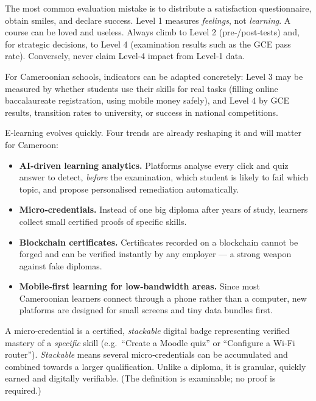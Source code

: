 \documentclass[11pt]{article}
\newcommand{\cle}[1]{{\popxbold\color{popdark}#1}}
\newcounter{popsec}
\newcounter{popsub}
\newcommand{\courssub}[1]{%
  \stepcounter{popsub}%
  \par\vspace{9pt}\noindent{\popxbold\fontsize{11.5}{13}\selectfont\color{popink}{\color{poporange}\thepopsec.\thepopsub}\hspace{6pt}#1}\par\nopagebreak\vspace{4pt}
}
\begin{document}
\begin{attention}
The most common evaluation mistake is to distribute a satisfaction questionnaire, obtain smiles, and declare success. Level 1 measures \emph{feelings}, not \emph{learning}. A course can be loved and useless. Always climb to Level 2 (pre‑/post‑tests) and, for strategic decisions, to Level 4 (examination results such as the GCE pass rate). Conversely, never claim Level‑4 impact from Level‑1 data.
\end{attention}

For Cameroonian schools, indicators can be adapted concretely: Level 3 may be measured by whether students use their skills for real tasks (filling online baccalaureate registration, using mobile money safely), and Level 4 by GCE results, transition rates to university, or success in national competitions.

\courssub{Future Trends in E‑Learning}

E‑learning evolves quickly. Four trends are already reshaping it and will matter for Cameroon:

\begin{itemize}
\item \textbf{AI‑driven learning analytics.} Platforms analyse every click and quiz answer to detect, \emph{before} the examination, which student is likely to fail which topic, and propose personalised remediation automatically.
\item \textbf{Micro‑credentials.} Instead of one big diploma after years of study, learners collect small certified proofs of specific skills.
\item \textbf{Blockchain certificates.} Certificates recorded on a blockchain cannot be forged and can be verified instantly by any employer — a strong weapon against fake diplomas.
\item \textbf{Mobile‑first learning for low‑bandwidth areas.} Since most Cameroonian learners connect through a phone rather than a computer, new platforms are designed for small screens and tiny data bundles first.
\end{itemize}

\begin{propriete}
A \cle{micro‑credential} is a certified, \emph{stackable} digital badge representing verified mastery of a \emph{specific} skill (e.g.\ ``Create a Moodle quiz'' or ``Configure a Wi‑Fi router''). \emph{Stackable} means several micro‑credentials can be accumulated and combined towards a larger qualification. Unlike a diploma, it is granular, quickly earned and digitally verifiable. (The definition is examinable; no proof is required.)
\end{propriete}
\end{document}
